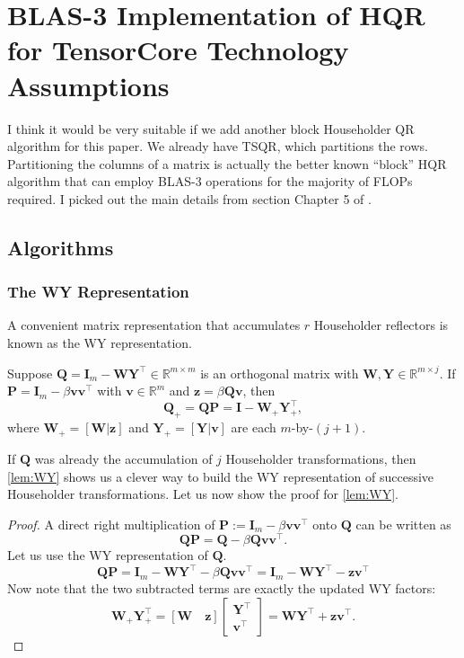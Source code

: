 \documentclass[review,onefignum,onetabnum]{siamart190516}
\newcommand{\R}{\mathbb{R}}
\newcommand{\bb}[1]{\mathbf{#1}}
\begin{document}
\section{BLAS-3 Implementation of HQR for TensorCore Technology Assumptions}
I think it would be very suitable if we add another block Householder QR algorithm for this paper. 
We already have TSQR, which partitions the rows. 
Partitioning the columns of a matrix is actually the better known ``block'' HQR algorithm that can employ BLAS-3 operations for the majority of FLOPs required. 
I picked out the main details from section Chapter 5 of \cite{golub2013matrix}.
\subsection{Algorithms}
\subsubsection{The WY Representation}
A convenient matrix representation that accumulates $r$ Householder reflectors is known as the WY representation.
\begin{lemma}\label{lem:WY}
	Suppose $\bb{Q}=\bb{I}_{m}-\bb{WY}^{\top}\in\R^{m\times m}$ is an orthogonal matrix with $\bb{W},\bb{Y}\in\R^{m\times j}$. If $\bb{P}=\bb{I}_{m}-\beta\bb{vv}^{\top}$ with $\bb{v}\in\R^m$ and $\bb{z}=\beta\bb{Q}\bb{v}$, then \[\bb{Q}_+ = \bb{Q}\bb{P} = \bb{I} - \bb{W}_+\bb{Y}_+^{\top}, \]where $ \bb{W}_+ =[\bb{W}|\bb{z}]$ and $ \bb{Y}_+ =[\bb{Y}|\bb{v}]$ are each $m$-by-$(j+1)$. 
\end{lemma}
If $\bb{Q}$ was already the accumulation of $j$ Householder transformations, then \cref{lem:WY} shows us a clever way to build the WY representation of successive Householder transformations.
Let us now show the proof for \cref{lem:WY}.
\begin{proof}
	A direct right multiplication of $\bb{P}:=\bb{I}_m - \beta\bb{v}\bb{v}^{\top}$ onto $\bb{Q}$ can be written as
	\begin{equation*}
		\bb{QP}=\bb{Q}-\beta\bb{Q}\bb{v}\bb{v}^{\top}.
	\end{equation*}
	Let us use the WY representation of $\bb{Q}$.
	\begin{equation*}
		\bb{QP}= \bb{I}_m - \bb{WY}^{\top} -\beta\bb{Q}\bb{v}\bb{v}^{\top} = \bb{I}_m - \bb{WY}^{\top} - \bb{z}\bb{v}^{\top}
	\end{equation*}
	Now note that the two subtracted terms are exactly the updated WY factors:
	\[ \bb{W}_+\bb{Y}_+^{\top} = [\bb{W} \quad \bb{z}]\begin{bmatrix}
	\bb{Y}^{\top}\\ 
	\bb{v}^{\top}
	\end{bmatrix} = \bb{WY}^{\top} + \bb{z}\bb{v}^{\top}.\]
\end{proof}
\end{document}

